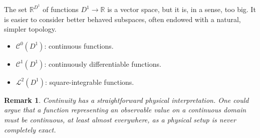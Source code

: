 \documentclass[sigplan,review,anonymous]{acmart}\settopmatter{printfolios=true,printccs=false,printacmref=false}
\theoremstyle{acmplain}
\theoremstyle{acmdefinition}
\newtheorem{remark}[theorem]{Remark}
\begin{document}
The set $\mathbb{R}^{D^1}$ of functions $D^1 \to \mathbb{R}$ is a vector space, but it is, in a sense, too big.
It is easier to consider better behaved subspaces, often endowed with a natural, simpler topology.
\begin{itemize}
\item $\mathcal{C}^0(D^1)$: continuous functions.
 \item $\mathcal{C}^1(D^1)$: continuously differentiable functions. %
 \item $\mathcal{L}^2(D^1)$: square-integrable functions. %
\end{itemize}
\begin{remark}
  Continuity has a straightforward physical interpretation.
  One could argue that a function representing an observable value on a continuous domain \emph{must} be continuous, at least almost everywhere,
  as a physical setup is never completely exact.
\end{remark}
\end{document}
